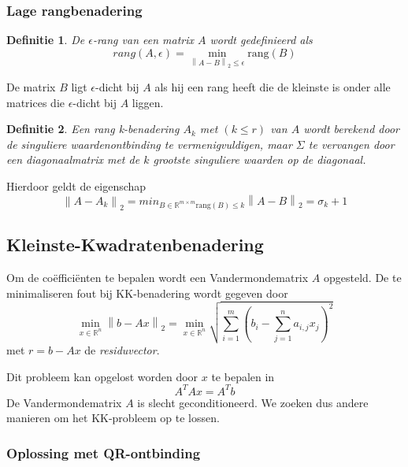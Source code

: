\documentclass{article}
\newtheorem{mydef}{Definitie}
\newcommand{\norm}[1]{\left\lVert#1\right\rVert}
\begin{document}
	\subsubsection{Lage rangbenadering}
	
	\begin{mydef}
		De $\epsilon$-rang van een matrix $A$ wordt gedefinieerd als
		$$
			rang(A,\epsilon) = \min_{\norm{A-B}_2 \leq \epsilon} \text{rang}(B)
		$$
	\end{mydef}
	De matrix $B$ ligt $\epsilon$-dicht bij $A$ als hij een rang heeft die de kleinste is onder alle matrices die $\epsilon$-dicht bij $A$ liggen.
	
	\begin{mydef}
		Een rang k-benadering $A_k$ met $(k \leq r)$ van $A$ wordt berekend door de singuliere waardenontbinding te vermenigvuldigen, maar $\Sigma$ te vervangen door een diagonaalmatrix met de $k$ grootste singuliere waarden op de diagonaal.
	\end{mydef}

	Hierdoor geldt de eigenschap
	$$
		\norm{A-A_k}_2 = min_{B \in \mathbb{R}^{m \times m} \text{rang}(B) \leq k} \norm{A-B}_2 = \sigma_k+1
	$$
	
	
	
	\subsection{Kleinste-Kwadratenbenadering}
	Om de coëfficiënten te bepalen wordt een Vandermondematrix $A$ opgesteld. 
	De te minimaliseren fout bij KK-benadering wordt gegeven door
	$$
	\min_{x \in \mathbb{R}^n} \norm{b-Ax}_2 
	= \min_{x \in \mathbb{R}^n} \sqrt{\sum_{i=1}^{m}(b_i - \sum_{j=1}^{n}a_{i,j}x_j)^2}
	$$
	met $r=b-Ax$ de \textit{residuvector}.
	
	Dit probleem kan opgelost worden door $x$ te bepalen in 
	$$
	A^TAx = A^Tb
	$$
	De Vandermondematrix $A$ is slecht geconditioneerd. We zoeken dus andere manieren om het KK-probleem op te lossen.\\
	
	\subsubsection{Oplossing met QR-ontbinding}
	
\end{document}
